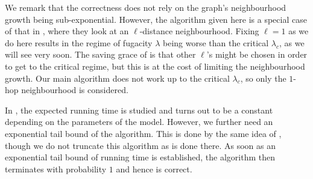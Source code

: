 \documentclass[11pt,a4paper]{amsart}
\renewcommand{\Pr}{\mathop{\mathrm{Pr}}\nolimits}
\newtheorem{corollary}[theorem]{Corollary}
\theoremstyle{definition}
\theoremstyle{remark}
\newcommand{\hcsampler}{\mathsf{HardcoreSampler}}
\newcommand{\dTV}{d_{\mathrm{TV}}}
\begin{document}
We remark that the correctness does not rely on the graph's neighbourhood growth being sub-exponential. 
However, the algorithm given here is a special case of that in \cite{AJ22}, where they look at an $\ell$-distance neighbourhood. 
Fixing $\ell=1$ as we do here results in the regime of fugacity $\lambda$ being worse than the critical $\lambda_c$, as we will see very soon. 
The saving grace of \cite{AJ22} is that other $\ell$'s might be chosen in order to get to the critical regime, but this is at the cost of limiting the neighbourhood growth. 
Our main algorithm does not work up to the critical $\lambda_c$, so only the $1$-hop neighbourhood is considered. 



In \cite{AJ22}, the expected running time is studied and turns out to be a constant depending on the parameters of the model. 
However, we further need an exponential tail bound of the algorithm. 
This is done by the same idea of \cite[Section B.3]{FGWWY22}, 
though we do not truncate this algorithm as is done there. 
As soon as an exponential tail bound of running time is established, the algorithm then terminates with probability $1$ and hence is correct. 
\end{document}
